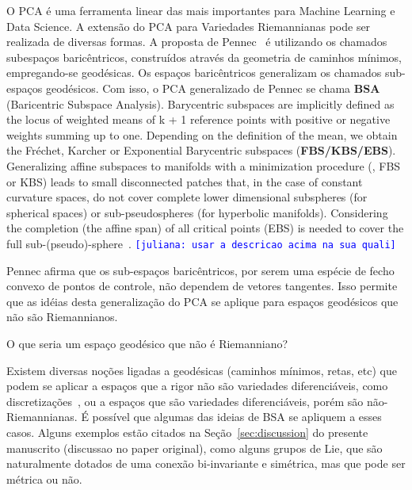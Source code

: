 \documentclass[a4paper,titlepage]{article}
\newcommand{\draftnote}[1]{\marginpar{\tiny\raggedright\textsf{\textcolor{blue}{\hspace{0pt}#1}}}}
\newcommand{\indraftnote}[1]{\textcolor{blue}{\texttt{\footnotesize [#1]}}}
\begin{document}
O PCA é uma ferramenta linear das mais importantes para Machine Learning e Data Science.
A extensão do PCA para Variedades Riemannianas pode ser realizada de diversas
formas. A proposta de Pennec~\cite{Pennec:AnnStat:2018,Pennec:Advances:Chapter:2020} é
utilizando os chamados subespaços baricêntricos, construídos através da
geometria de caminhos mínimos, empregando-se geodésicas. Os espaços
baricêntricos generalizam os chamados sub-espaços geodésicos. Com isso,
o PCA generalizado de Pennec se chama \textbf{BSA} (Baricentric Subspace
Analysis). %
\draftnote{BSA: usar esta sigla}%
Barycentric subspaces are implicitly defined
as the locus of weighted means of k + 1 reference points with positive or
negative weights summing up to one. Depending on the definition of the mean, we
obtain the Fréchet, Karcher or Exponential Barycentric subspaces
(\textbf{FBS/KBS/EBS}).
Generalizing affine subspaces to manifolds with a minimization procedure (\ie,
FBS or KBS) leads to small disconnected patches
that, in the case of constant curvature spaces, do not cover complete lower
dimensional subspheres (for spherical spaces) or sub-pseudospheres (for hyperbolic
manifolds). Considering the completion
(the affine span) of all critical points (EBS)
is needed to cover the full sub-(pseudo)-sphere~\cite{Pennec:Advances:Chapter:2020}.
\indraftnote{juliana: usar a descricao acima na sua quali}


Pennec afirma que os sub-espaços baricêntricos, por serem 
uma espécie de fecho convexo de pontos de controle, não dependem de vetores
tangentes. Isso permite que as idéias desta generalização do PCA se aplique para
espaços geodésicos que não são Riemannianos.

\begin{question}O que seria um espaço geodésico que não é Riemanniano?
\end{question}
Existem diversas noções ligadas a geodésicas (caminhos mínimos, retas, etc) que
podem se aplicar a espaços que a rigor não são variedades diferenciáveis, como
discretizações~\cite{Video:Geodesics:Crane}, ou a espaços que são variedades
diferenciáveis, porém são não-Riemannianas. É possível que algumas das ideias
de BSA se apliquem a esses casos. Alguns exemplos estão citados na
Seção~\ref{sec:discussion} do presente manuscrito (discussao no paper original), como alguns grupos de Lie, que são
naturalmente dotados de uma
conexão bi-invariante e simétrica, mas que pode ser métrica ou não.

\nocite{wikipedia:geodesic:2021}
\end{document}
